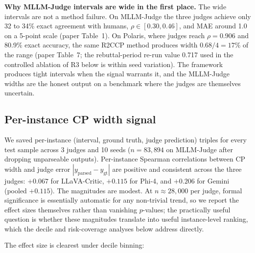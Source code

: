 \documentclass[11pt]{article}
\begin{document}
\textbf{Why MLLM-Judge intervals are wide in the first place.} The wide intervals are not a method failure. On MLLM-Judge the three judges achieve only 32 to 34\% exact agreement with humans, $\rho \in [0.30, 0.46]$, and MAE around 1.0 on a 5-point scale (paper Table~1). On Polaris, where judges reach $\rho = 0.906$ and 80.9\% exact accuracy, the same R2CCP method produces width $0.68/4 = 17\%$ of the range (paper Table~7; the rebuttal-period re-run value 0.717 used in the controlled ablation of R3 below is within seed variation). The framework produces tight intervals when the signal warrants it, and the MLLM-Judge widths are the honest output on a benchmark where the judges are themselves uncertain.

\subsection*{Per-instance CP width signal}

We saved per-instance (interval, ground truth, judge prediction) triples for every test sample across 3 judges and 10 seeds ($n = 83{,}894$ on MLLM-Judge after dropping unparseable outputs). Per-instance Spearman correlations between CP width and judge error $|y_{\text{parsed}} - y_{\text{gt}}|$ are positive and consistent across the three judges: $+0.067$ for LLaVA-Critic, $+0.115$ for Phi-4, and $+0.206$ for Gemini (pooled $+0.115$). The magnitudes are modest. At $n \approx 28{,}000$ per judge, formal significance is essentially automatic for any non-trivial trend, so we report the effect sizes themselves rather than vanishing $p$-values; the practically useful question is whether these magnitudes translate into useful instance-level ranking, which the decile and risk-coverage analyses below address directly.

The effect size is clearest under decile binning:
\end{document}
